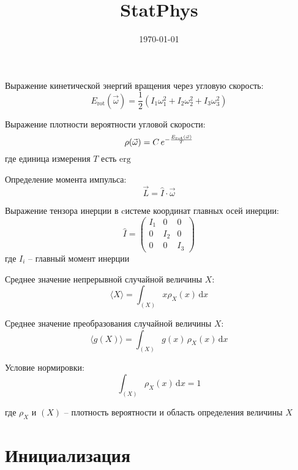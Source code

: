 \documentclass[11pt]{article}
\begin{document}
    
    \title{StatPhys}

\date{\today}
\maketitle


    
    

    
    Выражение кинетической энергий вращения через угловую скорость:
\[E_\text{rot}(\vec\omega) = \frac 1 2 \left(I_1 \omega_1^2 + I_2 \omega_2^2 + I_3 \omega_3^2 \right)\]

    Выражение плотности вероятности угловой скорости:
\[\rho(\vec\omega) = C \, e^{-{E_\text{rot}(\vec\omega) \over T}}\] где
единица измерения \(T\) есть \(\text{erg}\)

    Определение момента импульса: \[\vec L = \hat I \cdot \vec \omega\]

Выражение тензора инерции в cистеме координат главных осей инерции:
\[\hat I = \begin{pmatrix} I_1 & 0 & 0 \\ 0 & I_2 & 0 \\ 0 & 0 & I_3 \end{pmatrix}\]
где \(I_i\) -- главный момент инерции

    Среднее значение непрерывной случайной величины \(X\):
\[\langle X \rangle = \int_{(X)} \! x \rho_X(x) \, \mathrm dx\]

Среднее значение преобразования случайной величины \(X\):
\[\langle g(X) \rangle = \int_{(X)} \! g(x) \, \rho_X(x) \, \mathrm dx\]

Условие нормировки: \[\int_{(X)} \! \rho_X(x) \, \mathrm dx = 1\]

где \(\rho_X\) и \((X)\) -- плотность вероятности и область определения
величины \(X\)

    \hypertarget{ux438ux43dux438ux446ux438ux430ux43bux438ux437ux430ux446ux438ux44f}{%
\section{Инициализация}\label{ux438ux43dux438ux446ux438ux430ux43bux438ux437ux430ux446ux438ux44f}}
\end{document}
